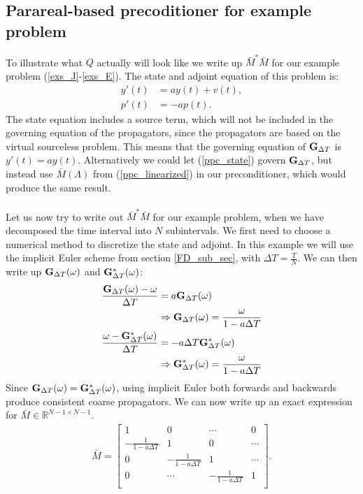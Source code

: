 \documentclass[11pt,a4paper]{article}
\begin{document}
\subsection{Parareal-based precoditioner for example problem}
To illustrate what $Q$ actually will look like we write up $\bar M^*\bar M$ for our example problem (\ref{exs_J}-\ref{exs_E}). The state and adjoint equation of this problem is:
\begin{align}
y'(t) &= ay(t) + v(t), \label{ppc_state} \\
p'(t) &= -ap(t). \label{ppc_adjoint}
\end{align}
The state equation includes a source term, which will not be included in the governing equation of the propagators, since the propagators are based on the virtual sourceless problem. This means that the governing equation of $\bold G_{\Delta T}$ is $y'(t) = ay(t)$. Alternatively we could let (\ref{ppc_state}) govern $\bold G_{\Delta T}$, but instead use $\bar M(\Lambda)$ from (\ref{ppc_linearized}) in our preconditioner, which would produce the same result. 
\\
\\
Let us now try to write out $\bar M^*\bar M$ for our example problem, when we have decomposed the time interval into $N$ subintervals. We first need to choose a numerical method to discretize the state and adjoint. In this example we will use the implicit Euler scheme from section \ref{FD_sub_sec}, with $\Delta T=\frac{T}{N}$. We can then write up $\bold G_{\Delta T}(\omega)$ and $\bold G_{\Delta T}^*(\omega)$:
\begin{align*}
\frac{\bold G_{\Delta T}(\omega)-\omega}{\Delta T}&=  a\bold G_{\Delta T}(\omega) \\
&\Rightarrow \bold G_{\Delta T}(\omega)= \frac{\omega}{1-a\Delta T} \\
\frac{\omega-\bold G_{\Delta T}^*(\omega)}{\Delta T}&= -a\Delta T \bold G_{\Delta T}^*(\omega) \\
&\Rightarrow \bold G_{\Delta T}^*(\omega)= \frac{\omega}{1-a\Delta T} 
\end{align*}
Since $\bold G_{\Delta T}(\omega)= \bold G_{\Delta T}^*(\omega)$, using implicit Euler both forwards and backwards produce consistent coarse propagators. We can now write up an exact expression for $\bar M\in\mathbb{R}^{N-1\times N-1}$. 
\begin{align*}
\bar M = \left[ \begin{array}{cccc}
   	1 & 0 & \cdots & 0 \\  
   	-\frac{1}{1-a\Delta T} & 1 & 0 & \cdots \\ 
   	0 &-\frac{1}{1-a\Delta T} & 1  & \cdots \\
   	0 &\cdots &-\frac{1}{1-a\Delta T} & 1  \\
  	\end{array}  \right].
\end{align*}
\end{document}
